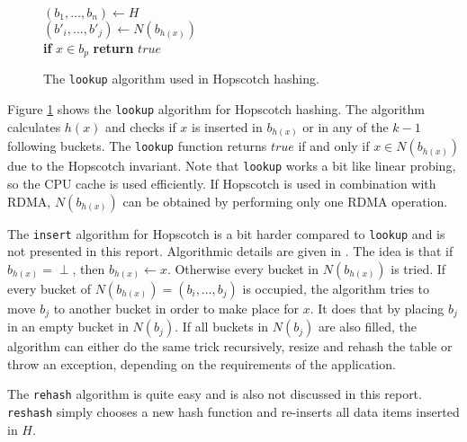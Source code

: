 \begin{figure}
	\centering
	\begin{algorithm}[H]
		\SetStartEndCondition{ }{}{}%
		\AlgoDontDisplayBlockMarkers\SetAlgoNoEnd\SetAlgoNoLine%

		 {
			$(b_1, \dots, b_n) \gets H$ \\
			$(b'_i, \dots, b'_j) \gets N(b_{h(x)})$ \\

			 {
				\textbf{if} $x \in b_p$ \textbf{return} $true$
			}

		}
	\end{algorithm}
	\label{fig:hopscotch_lookup}
	\caption{The \texttt{lookup} algorithm used in Hopscotch hashing.}
\end{figure}

Figure \ref{fig:hopscotch_lookup} shows the \texttt{lookup} algorithm for Hopscotch hashing. The algorithm calculates $h(x)$ and checks if $x$ is inserted in $b_{h(x)}$ or in any of the $k - 1$ following buckets. The \texttt{lookup} function returns $true$ if and only if $x \in N(b_{h(x)})$ due to the Hopscotch invariant. Note that \texttt{lookup} works a bit like linear probing, so the CPU cache is used efficiently. If Hopscotch is used in combination with RDMA, $N(b_{h(x)})$ can be obtained by performing only one RDMA operation. 

The \texttt{insert} algorithm for Hopscotch is a bit harder compared to \texttt{lookup} and is not presented in this report. Algorithmic details are given in \cite{hopscotch}. The idea is that if $b_{h(x)} = \perp$, then $b_{h(x)} \gets x$. Otherwise every bucket in $N(b_{h(x)})$ is tried. If every bucket of $N(b_{h(x)}) = (b_i, \dots, b_j)$ is occupied, the algorithm tries to move $b_j$ to another bucket in order to make place for $x$. It does that by placing $b_j$ in an empty bucket in $N(b_j)$. If all buckets in $N(b_j)$ are also filled, the algorithm can either do the same trick recursively, resize and rehash the table or throw an exception, depending on the requirements of the application.

The \texttt{rehash} algorithm is quite easy and is also not discussed in this report. \texttt{reshash} simply chooses a new hash function and re-inserts all data items inserted in $H$.

